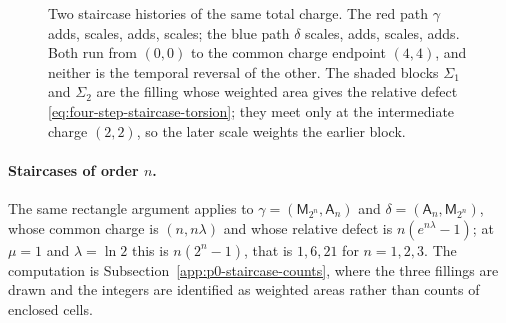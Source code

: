 \begin{figure}[t]
\centering
\caption{Two staircase histories of the same total charge.  The red path
$\gamma$ adds, scales, adds, scales; the blue path $\delta$ scales, adds,
scales, adds.  Both run from $(0,0)$ to the common charge endpoint $(4,4)$,
and neither is the temporal reversal of the other.  The shaded blocks
$\Sigma_1$ and $\Sigma_2$ are the filling whose weighted area gives the
relative defect \eqref{eq:four-step-staircase-torsion}; they meet only at the
intermediate charge $(2,2)$, so the later scale weights the earlier block.}
\label{fig:p0-same-charge-different-histories}
\end{figure}

\paragraph{Staircases of order \(n\).}
The same rectangle argument applies to
\(\gamma=(\mathsf M_{2^n},\mathsf A_n)\) and \(\delta=(\mathsf A_n,\mathsf
M_{2^n})\), whose common charge is \((n,n\lambda)\) and whose relative defect
is \(n(e^{n\lambda}-1)\); at \(\mu=1\) and \(\lambda=\ln2\) this is
\(n(2^{n}-1)\), that is \(1,6,21\) for \(n=1,2,3\).  The computation is
Subsection~\ref{app:p0-staircase-counts}, where the three fillings are drawn
and the integers are identified as weighted areas rather than counts of
enclosed cells.

